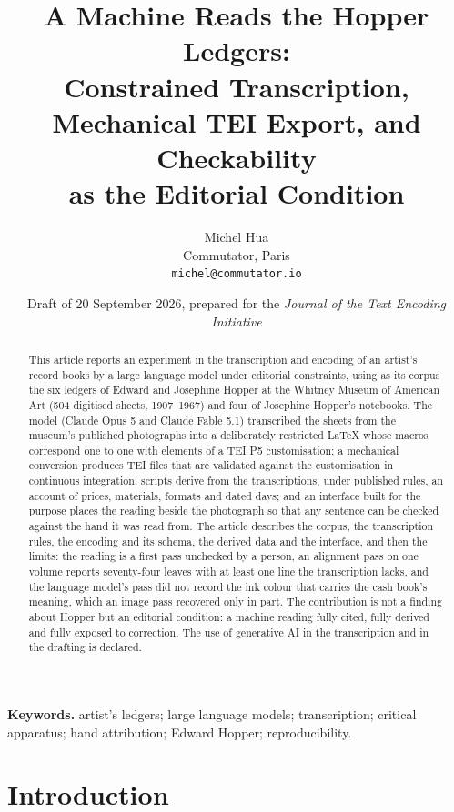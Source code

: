 \documentclass[11pt]{article}
\title{\Large A Machine Reads the Hopper Ledgers:\\ Constrained Transcription, Mechanical TEI Export, and Checkability\\ as the Editorial Condition}
\author{Michel Hua\\ \small Commutator, Paris\\ \small \texttt{michel@commutator.io}}
\date{\small Draft of 20 September 2026, prepared for the \emph{Journal of the Text Encoding Initiative}}
\begin{document}
\maketitle

\begin{abstract}
\noindent This article reports an experiment in the transcription and encoding of an artist's record books by a large language model under editorial constraints, using as its corpus the six ledgers of Edward and Josephine Hopper at the Whitney Museum of American Art (504 digitised sheets, 1907--1967) and four of Josephine Hopper's notebooks. The model (Claude Opus 5 and Claude Fable 5.1) transcribed the sheets from the museum's published photographs into a deliberately restricted LaTeX whose macros correspond one to one with elements of a TEI P5 customisation; a mechanical conversion produces TEI files that are validated against the customisation in continuous integration; scripts derive from the transcriptions, under published rules, an account of prices, materials, formats and dated days; and an interface built for the purpose places the reading beside the photograph so that any sentence can be checked against the hand it was read from. The article describes the corpus, the transcription rules, the encoding and its schema, the derived data and the interface, and then the limits: the reading is a first pass unchecked by a person, an alignment pass on one volume reports seventy-four leaves with at least one line the transcription lacks, and the language model's pass did not record the ink colour that carries the cash book's meaning, which an image pass recovered only in part. The contribution is not a finding about Hopper but an editorial condition: a machine reading fully cited, fully derived and fully exposed to correction. The use of generative AI in the transcription and in the drafting is declared.
\end{abstract}

\noindent\textbf{Keywords.} artist's ledgers; large language models; transcription; critical apparatus; hand attribution; Edward Hopper; reproducibility.

\section{Introduction}
\end{document}
